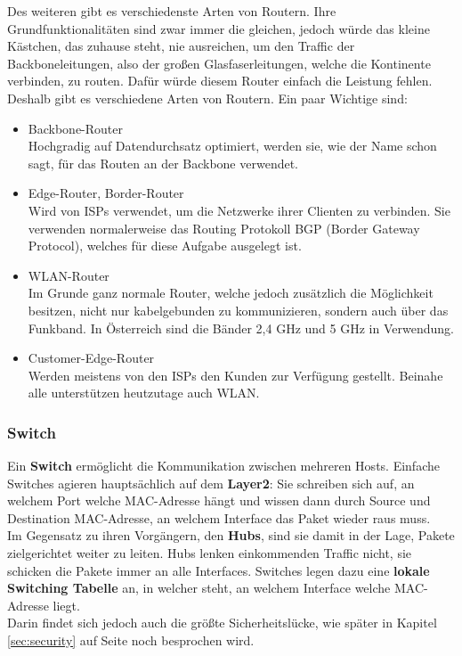 \documentclass[12pt,a4paper]{report}
\begin{document}
Des weiteren gibt es verschiedenste Arten von Routern. Ihre Grundfunktionalitäten sind zwar immer die gleichen, jedoch würde das kleine Kästchen, das zuhause steht, nie ausreichen, um den Traffic der Backboneleitungen, also der großen Glasfaserleitungen, welche die Kontinente verbinden, zu routen. Dafür würde diesem Router einfach die Leistung fehlen.\\
Deshalb gibt es verschiedene Arten von Routern. Ein paar Wichtige sind:\\
\begin{itemize}
\item Backbone-Router\\
Hochgradig auf Datendurchsatz optimiert, werden sie, wie der Name schon sagt, für das Routen an der Backbone verwendet.
\item Edge-Router, Border-Router\\
Wird von ISPs verwendet, um die Netzwerke ihrer Clienten zu verbinden. Sie verwenden normalerweise das Routing Protokoll BGP (Border Gateway Protocol), welches für diese Aufgabe ausgelegt ist.
\item WLAN-Router\\
Im Grunde ganz normale Router, welche jedoch zusätzlich die Möglichkeit besitzen, nicht nur kabelgebunden zu kommunizieren, sondern auch über das Funkband. In Österreich sind die Bänder 2,4 GHz und 5 GHz in Verwendung.
\item Customer-Edge-Router\\
Werden meistens von den ISPs den Kunden zur Verfügung gestellt. Beinahe alle unterstützen heutzutage auch WLAN.
\end{itemize}
\subsubsection{Switch}
Ein \textbf{Switch} ermöglicht die Kommunikation zwischen mehreren Hosts. Einfache Switches agieren hauptsächlich auf dem \textbf{Layer2}: Sie schreiben sich auf, an welchem Port welche MAC-Adresse hängt und wissen dann durch Source und Destination MAC-Adresse, an welchem Interface das Paket wieder raus muss.\\

Im Gegensatz zu ihren Vorgängern, den \textbf{Hubs}, sind sie damit in der Lage, Pakete zielgerichtet weiter zu leiten. Hubs lenken einkommenden Traffic nicht, sie schicken die Pakete immer an alle Interfaces. Switches legen dazu eine \textbf{lokale Switching Tabelle} an, in welcher steht, an welchem Interface welche MAC-Adresse liegt.\\
Darin findet sich jedoch auch die größte Sicherheitslücke, wie später in Kapitel \ref{sec:security} auf Seite \pageref{sec:security} noch besprochen wird.\\
\end{document}
